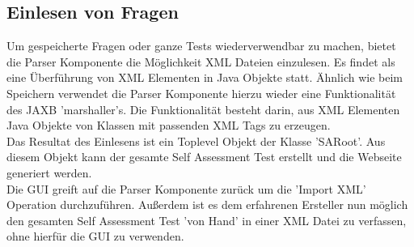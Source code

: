\subsection{Einlesen von Fragen}
Um gespeicherte Fragen oder ganze Tests wiederverwendbar zu machen, bietet die Parser Komponente die Möglichkeit XML Dateien einzulesen. Es findet als eine Überführung von XML Elementen in Java Objekte statt. Ähnlich wie beim Speichern verwendet die Parser Komponente hierzu wieder eine Funktionalität des JAXB 'marshaller's. Die Funktionalität besteht darin, aus XML Elementen Java Objekte von Klassen mit passenden XML Tags zu erzeugen.\\
Das Resultat des Einlesens ist ein Toplevel Objekt der Klasse 'SARoot'. Aus diesem Objekt kann der gesamte Self Assessment Test erstellt und die Webseite generiert werden. \\
Die GUI greift auf die Parser Komponente zurück um die 'Import XML' Operation durchzuführen. Außerdem ist es dem erfahrenen Ersteller nun möglich den gesamten Self Assessment Test 'von Hand' in einer XML Datei zu verfassen, ohne hierfür die GUI zu verwenden. 



